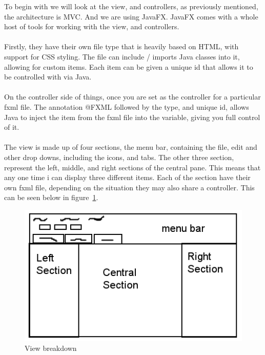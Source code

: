 To begin with we will look at the view, and controllers, as previously mentioned, the architecture is MVC. And we are using JavaFX. JavaFX comes with a whole host of tools for working with the view, and controllers. 
\\\\
Firstly, they have their own file type that is heavily based on HTML, with support for CSS styling. The file can include / imports Java classes into it, allowing for custom items. Each item can be given a unique id that allows it to be controlled with via Java.
\\\\
On the controller side of things, once you are set as the controller for a particular fxml file. The annotation @FXML followed by the type, and unique id, allows Java to inject the item from the fxml file into the variable, giving you full control of it.  
\\\\
The view is made up of four sections, the menu bar, containing the file, edit and other drop downs, including the icons, and tabs. The other three section, represent the left, middle, and right sections of the central pane. This means that any one time i can display three different items. Each of the section have their own fxml file, depending on the situation they may also share a controller. This can be seen below in figure~\ref{fig:view_breakdown}.

\begin{figure}[H]
	\centering
	\includegraphics[scale=0.5]{images/view_breakdown.png}
	\caption{View breakdown}
	\label{fig:view_breakdown}
\end{figure}

